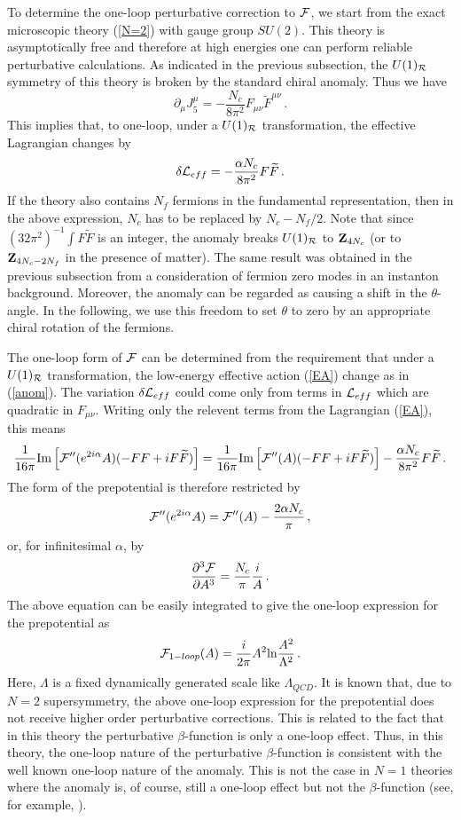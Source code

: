 To determine the one-loop perturbative correction to ${\cal F}$, we
start from the exact microscopic theory (\ref{N=2}) with gauge group
$SU(2)$. This theory is asymptotically free and therefore at high
energies one can perform reliable perturbative calculations. As
indicated in the previous subsection, the $U(1)_{\cal R}$ symmetry of
this theory is broken by the standard chiral anomaly. Thus we have 
$$
\partial_\mu J^\mu_5= -\frac{N_c}{8\pi^2}F_{\mu\nu}\widetilde
F^{\mu\nu} \,.
$$
This implies that, to one-loop, under a $U(1)_{\cal R}$
transformation, the effective Lagrangian changes by 
\begin{equation}
\delta {\cal L}_{eff}= - \frac{\alpha N_c}{8\pi^2} F\widetilde F\,.
\label{anom}
\end{equation}
If the theory also contains $N_f$ fermions in the fundamental
representation, then in the above expression, $N_c$ has to be replaced
by $N_c-N_f/2$. Note that since $(32\pi^2)^{-1}\int F\widetilde F$ is
an integer, the anomaly breaks $U(1)_{\cal R}$ to ${\bf Z}_{4N_c}$ (or
to ${\bf Z}_{4N_c-2N_f}$ in the presence of matter). The same result
was obtained in the previous subsection from a consideration of
fermion zero modes in an instanton background.  Moreover, the anomaly
can be regarded as causing a shift in the $\theta$-angle. In the
following, we use this freedom to set $\theta$ to zero by an
appropriate chiral rotation of the fermions.
 
The one-loop form of ${\cal F}$ can be determined from the requirement
that under a $U(1)_{\cal R}$ transformation, the low-energy effective
action (\ref{EA}) change as in (\ref{anom}). The variation $\delta
{\cal L}_{eff}$ could come only from terms in ${\cal L}_{eff}$ which
are quadratic in $F_{\mu\nu}$. Writing only the relevent terms from
the Lagrangian (\ref{EA}), this means
$$ 
\frac{1}{16\pi}{\rm Im}\left[{\cal F}''(e^{2i\alpha}A)(-FF + iF
\widetilde F)\right] = \frac{1}{16\pi}{\rm Im}\left[{\cal F}''(A)
(-FF+iF\widetilde F)\right]-\frac{\alpha N_c}{8\pi^2}F\widetilde F\,.
$$ 
The form of the prepotential is therefore restricted by 
$$
{\cal F}''(e^{2i\alpha}A)={\cal F}''(A) - \frac{2\alpha N_c}{\pi}\,,
$$
or, for infinitesimal $\alpha$, by
$$
\frac{\partial^3 {\cal F}}{\partial A^3}=\frac{N_c}{\pi}\frac{i}{A}\,.
$$
The above equation can be easily integrated to give the one-loop
expression for the prepotential as 
\begin{equation}
{\cal F}_{1-loop}(A)=\frac{i}{2\pi} A^2 {\rm ln} \frac{A^2}{\Lambda^2}\,.
\label{oneloop}
\end{equation}
Here, $\Lambda$ is a fixed dynamically generated scale like
$\Lambda_{QCD}$.  It is known that, due to $N=2$ supersymmetry, the
above one-loop expression for the prepotential does not receive higher
order perturbative corrections. This is related to the fact that in
this theory the perturbative $\beta$-function is only a one-loop
effect. Thus, in this theory, the one-loop nature of the perturbative
$\beta$-function is consistent with the well known one-loop nature of
the anomaly. This is not the case in $N=1$ theories where the anomaly
is, of course, still a one-loop effect but not the $\beta$-function
(see, for example, \cite{SV1, SV2}).

